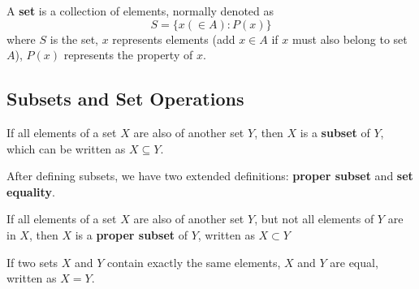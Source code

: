 A \textbf{set} is a collection of elements, normally denoted as
$$
S = \{x (\in A):P(x)\}
$$
where $S$ is the set, $x$ represents elements (add $x\in A$ if $x$ must also belong to set $A$), $P(x)$ represents the property of $x$.

\subsection{Subsets and Set Operations}
\begin{definition}
    If all elements of a set $X$ are also of another set $Y$, then $X$ is a \textbf{subset} of $Y$, which can be written as $X\subseteq Y$.
\end{definition}

After defining subsets, we have two extended definitions: \textbf{proper subset} and \textbf{set equality}.
\begin{definition}
    If all elements of a set $X$ are also of another set $Y$, but not all elements of $Y$ are in $X$, then $X$ is a \textbf{proper subset} of $Y$, written as $X \subset Y$
\end{definition}
\begin{definition}
    If two sets $X$ and $Y$ contain exactly the same elements, $X$ and $Y$ are equal, written as $X=Y$.
\end{definition}